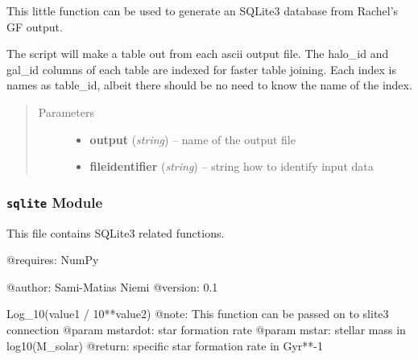 \documentclass[letterpaper,10pt,english]{sphinxmanual}
\begin{document}

\begin{fulllineitems}
\label{SamPy.db:SamPy.db.insertSAMTablesToSQLite.generateSQLiteDBfromSAMTables}
This little function can be used to generate an
SQLite3 database from Rachel's GF output.

The script will make a table out from each ascii 
output file. The halo\_id and gal\_id columns of
each table are indexed for faster table joining.
Each index is names as table\_id, albeit there
should be no need to know the name of the index.
\begin{quote}\begin{description}
\item[{Parameters}] \leavevmode\begin{itemize}
\item {} 
\textbf{output} (\emph{string}) -- name of the output file

\item {} 
\textbf{fileidentifier} (\emph{string}) -- string how to identify input data

\end{itemize}

\end{description}\end{quote}

\end{fulllineitems}



\subsubsection{\texttt{sqlite} Module}
\label{SamPy.db:sqlite-module}\label{SamPy.db:module-SamPy.db.sqlite}
This file contains SQLite3 related functions.

@requires: NumPy

@author: Sami-Matias Niemi
@version: 0.1


\begin{fulllineitems}
\label{SamPy.db:SamPy.db.sqlite.SSFR}
Log\_10(value1 / 10**value2)
@note: This function can be passed on to slite3 connection
@param mstardot: star formation rate
@param mstar: stellar mass in log10(M\_solar)
@return: specific star formation rate in Gyr**-1

\end{fulllineitems}
\end{document}
